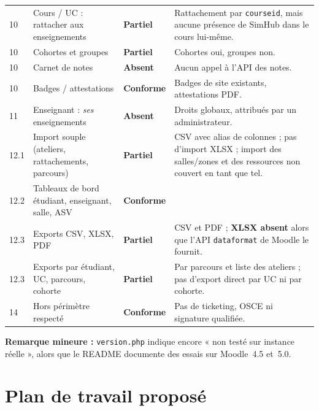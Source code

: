\documentclass[11pt,a4paper]{article}
\newcommand{\OK}{\textcolor{ok}{\textbf{Conforme}}}
\newcommand{\PART}{\textcolor{part}{\textbf{Partiel}}}
\newcommand{\KO}{\textcolor{ko}{\textbf{Absent}}}
\newcommand{\code}[1]{\texttt{\small #1}}
\begin{document}
\begin{longtable}{>{\raggedright}p{1.3cm}>{\raggedright}p{4.2cm}p{1.95cm}>{\raggedright\arraybackslash}p{7.05cm}}
10 & Cours / UC : rattacher aux enseignements & \PART & Rattachement par \code{courseid},
mais aucune présence de SimHub dans le cours lui-même. \\
10 & Cohortes et groupes & \PART & Cohortes oui, groupes non. \\
10 & Carnet de notes & \KO & Aucun appel à l'API des notes. \\
10 & Badges / attestations & \OK & Badges de site existants, attestations PDF. \\
11 & Enseignant : \emph{ses} enseignements & \KO & Droits globaux, attribués par un
administrateur. \\
12.1 & Import souple (ateliers, rattachements, parcours) & \PART & CSV avec alias de
colonnes ; pas d'import XLSX ; import des salles/zones et des ressources non couvert en tant
que tel. \\
12.2 & Tableaux de bord étudiant, enseignant, salle, ASV & \OK & \\
12.3 & Exports CSV, XLSX, PDF & \PART & CSV et PDF ; \textbf{XLSX absent} alors que
l'API \code{dataformat} de Moodle le fournit. \\
12.3 & Exports par étudiant, UC, parcours, cohorte & \PART & Par parcours et liste des
ateliers ; pas d'export direct par UC ni par cohorte. \\
14 & Hors périmètre respecté & \OK & Pas de ticketing, OSCE ni signature qualifiée. \\
\end{longtable}

\noindent\textbf{Remarque mineure :} \code{version.php} indique encore « non testé sur
instance réelle », alors que le README documente des essais sur Moodle~4.5 et~5.0.

\section{Plan de travail proposé}
\end{document}
